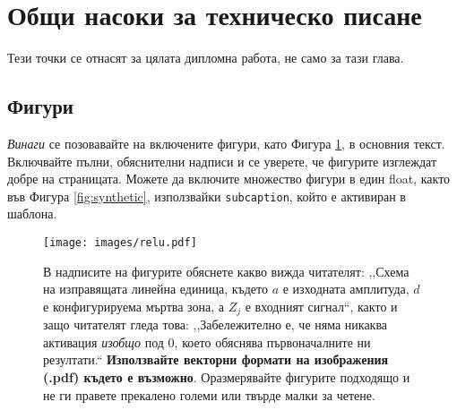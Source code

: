 \section{Общи насоки за техническо писане}

Тези точки се отнасят за цялата дипломна работа, не само за тази глава.

\subsection{Фигури}
\emph{Винаги} се позовавайте на включените фигури, като Фигура \cref{fig:relu}, в основния текст. Включвайте пълни, обяснителни надписи и се уверете, че фигурите изглеждат добре на страницата.
Можете да включите множество фигури в един float, както във Фигура \cref{fig:synthetic}, използвайки \texttt{subcaption}, който е активиран в шаблона.


\begin{figure}[htb]
    \centering
    \texttt{[image: images/relu.pdf]}    

    \caption{В надписите на фигурите обяснете какво вижда читателят: ,,Схема на изправящата линейна единица, където $a$ е изходната амплитуда,
    $d$ е конфигурируема мъртва зона, а $Z_j$ е входният сигнал``, както и защо читателят гледа това: 
    ,,Забележително е, че няма никаква активация \emph{изобщо} под 0, което обяснява първоначалните ни резултати.`` 
    \textbf{Използвайте векторни формати на изображения (.pdf) където е възможно}. Оразмерявайте фигурите подходящо и не ги правете прекалено големи или твърде малки за четене.
    }

    \label{fig:relu} 
\end{figure}



